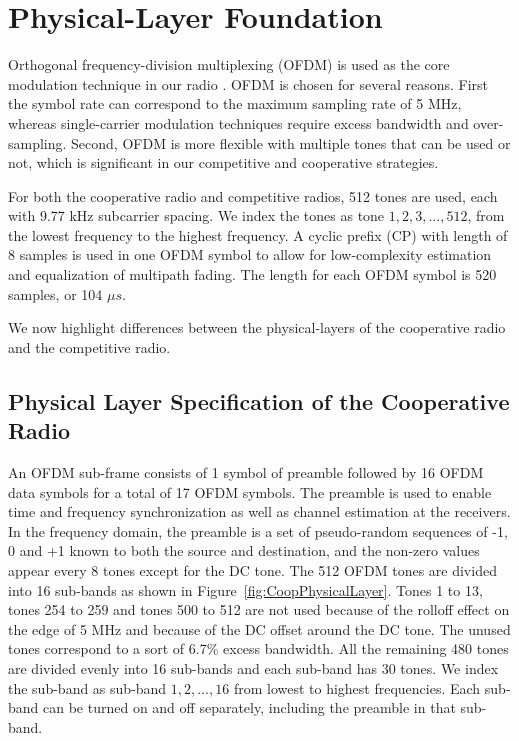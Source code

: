 \section{Physical-Layer Foundation}
Orthogonal frequency-division multiplexing (OFDM) is used as the core modulation technique in our radio \cite{DingNieCompetitivePlan2013}. OFDM is chosen for several reasons. First the symbol rate can correspond to the maximum sampling rate of 5 MHz, whereas single-carrier modulation techniques require excess bandwidth and over-sampling. Second, OFDM is more flexible with multiple tones that can be used or not, which is significant in our competitive and cooperative strategies.

For both the cooperative radio and competitive radios, 512 tones are used, each with 9.77 kHz subcarrier spacing. We index the tones as tone $1,2,3,...,512$, from the lowest frequency to the highest frequency. A cyclic prefix (CP) with length of 8 samples is used in one OFDM symbol to allow for low-complexity estimation and equalization of multipath fading. The length for each OFDM symbol is 520 samples, or 104 $\mu s$.

We now highlight differences between the physical-layers of the cooperative radio and the competitive radio.

\subsection{Physical Layer Specification of the Cooperative Radio}
\label{coopPhysicalLayer}
An OFDM sub-frame consists of 1 symbol of preamble followed by 16 OFDM data symbols for a total of 17 OFDM symbols. The preamble is used to enable time and frequency synchronization as well as channel estimation at the receivers. In the frequency domain, the preamble is a set of pseudo-random sequences of -1, 0 and +1 known to both the source and destination, and the non-zero values appear every 8 tones except for the DC tone. The 512 OFDM tones are divided into 16 sub-bands as shown in Figure~\ref{fig:CoopPhysicalLayer}. Tones 1 to 13, tones 254 to 259 and tones 500 to 512 are not used because of the rolloff effect on the edge of 5 MHz and because of the DC offset around the DC tone. The unused tones correspond to a sort of 6.7$\%$ excess bandwidth. All the remaining 480 tones are divided evenly into 16 sub-bands and each sub-band has 30 tones. We index the sub-band as sub-band $1,2,...,16$ from lowest to highest frequencies. Each sub-band can be turned on and off separately, including the preamble in that sub-band.

